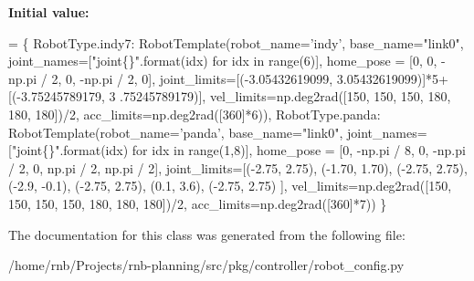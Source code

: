 {\bfseries Initial value\+:}
\begin{DoxyCode}
=  \{
        RobotType.indy7: RobotTemplate(robot\_name=\textcolor{stringliteral}{'indy'}, base\_name=\textcolor{stringliteral}{"link0"},
                                       joint\_names=[\textcolor{stringliteral}{"joint\{\}"}.format(idx) \textcolor{keywordflow}{for} idx \textcolor{keywordflow}{in} range(6)],
                                       home\_pose = [0, 0, -np.pi / 2, 0, -np.pi / 2, 0],
                                       joint\_limits=[(-3.05432619099, 3.05432619099)]*5+[(-3.75245789179, 3
      .75245789179)],
                                       vel\_limits=np.deg2rad([150, 150, 150, 180, 180, 180])/2,
                                       acc\_limits=np.deg2rad([360]*6)),
        RobotType.panda: RobotTemplate(robot\_name=\textcolor{stringliteral}{'panda'}, base\_name=\textcolor{stringliteral}{"link0"},
                                       joint\_names=[\textcolor{stringliteral}{"joint\{\}"}.format(idx) \textcolor{keywordflow}{for} idx \textcolor{keywordflow}{in} range(1,8)],
                                       home\_pose = [0, -np.pi / 8, 0, -np.pi / 2, 0, np.pi / 2, np.pi / 2],
                                       joint\_limits=[(-2.75, 2.75), (-1.70, 1.70), (-2.75, 2.75),
                                                     (-2.9, -0.1), (-2.75, 2.75), (0.1, 3.6), (-2.75, 2.75)
      ],
                                       vel\_limits=np.deg2rad([150, 150, 150, 150, 180, 180, 180])/2,
                                       acc\_limits=np.deg2rad([360]*7))
    \}
\end{DoxyCode}


The documentation for this class was generated from the following file\+:\begin{DoxyCompactItemize}
\item 
/home/rnb/\+Projects/rnb-\/planning/src/pkg/controller/robot\+\_\+config.\+py\end{DoxyCompactItemize}
